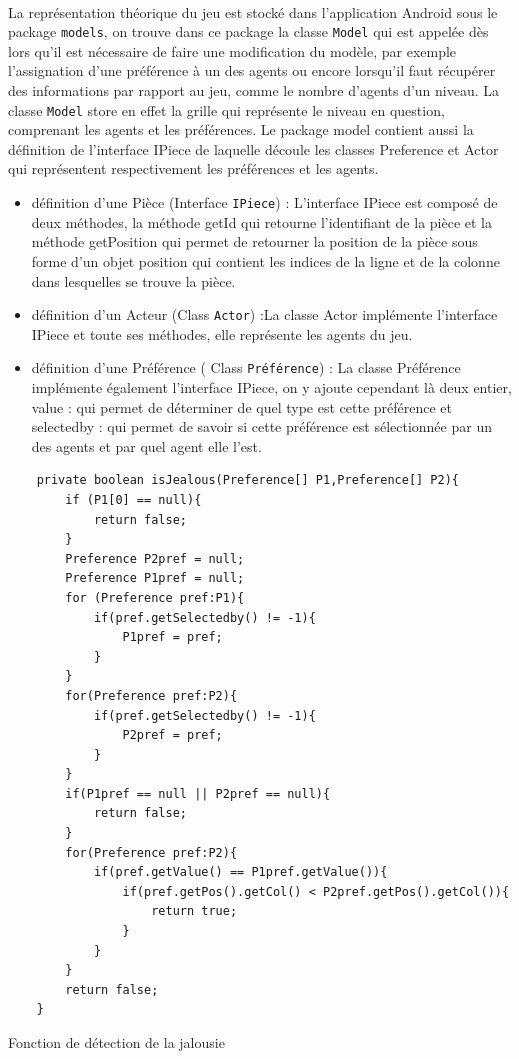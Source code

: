 \documentclass[a4paper, 10pt]{article}
\begin{document}
\paragraph{}
La représentation théorique du jeu est stocké dans l'application Android sous le package \texttt{models}, on trouve dans ce package la classe \texttt{Model} qui est appelée dès lors qu'il est nécessaire de faire une modification du modèle, par exemple l'assignation d'une préférence à un des agents ou encore lorsqu'il faut récupérer des informations par rapport au jeu, comme le nombre d'agents d'un niveau. La classe 
\texttt{Model} store en effet la grille qui représente le niveau en question, comprenant les agents et les préférences. Le package model contient aussi la définition de l’interface IPiece de laquelle découle les classes Preference et Actor qui représentent respectivement les préférences et les agents.
 \begin{itemize}
\item définition d'une Pièce (Interface \texttt{IPiece}) : L’interface IPiece est composé de deux méthodes, la méthode getId qui retourne l'identifiant de la pièce et la méthode getPosition qui permet de retourner la position de la pièce sous forme d’un objet position qui contient les indices de la ligne et de la colonne dans lesquelles se trouve la pièce.   
\item définition d’un Acteur (Class \texttt{Actor}) :La classe Actor implémente l'interface IPiece et toute ses méthodes, elle représente les agents du jeu.                                                                                                                                                                                                                                                                                                                                      
\item définition d’une Préférence ( Class \texttt{Préférence}) : La classe Préférence implémente également l’interface IPiece, on y ajoute cependant là deux entier, value : qui permet de déterminer de quel type est cette préférence et selectedby : qui permet de savoir si cette préférence est sélectionnée par un des agents et par quel agent elle l’est. 
\end{itemize}
\hfill \break
\begin{lstlisting}
    private boolean isJealous(Preference[] P1,Preference[] P2){
        if (P1[0] == null){
            return false;
        }
        Preference P2pref = null;
        Preference P1pref = null;
        for (Preference pref:P1){
            if(pref.getSelectedby() != -1){
                P1pref = pref;
            }
        }
        for(Preference pref:P2){
            if(pref.getSelectedby() != -1){
                P2pref = pref;
            }
        }
        if(P1pref == null || P2pref == null){
            return false;
        }
        for(Preference pref:P2){
            if(pref.getValue() == P1pref.getValue()){
                if(pref.getPos().getCol() < P2pref.getPos().getCol()){
                    return true;
                }
            }
        }
        return false;
    }
\end{lstlisting}
Fonction de détection de la jalousie 
\end{document}
